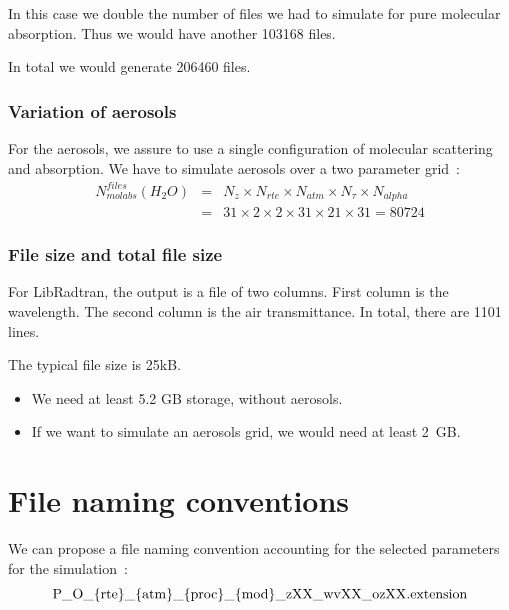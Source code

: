 \documentclass[a4paper]{article}
\begin{document}
In this case we double the number of files we had to simulate for pure molecular absorption.
Thus we would have another 103168 files.

In total we would generate 206460 files.


\subsubsection{Variation of aerosols}
For the aerosols, we assure to use a single configuration of molecular scattering and absorption.
We have to simulate aerosols over a two parameter grid~:
\begin{eqnarray}
N^{files}_{molabs}(H_2O) & = & N_z \times N_{rte} \times N_{atm} \times N_{\tau} \times N_{alpha}  \\ \nonumber
                                          & =  & 31   \times   2        \times    2         \times     31        \times     21            \times 31 = 80724
\end{eqnarray}




\subsubsection{File size and total file size}
For LibRadtran, the output is a file of two columns. First column is the wavelength. The second column is the air transmittance.
In total, there are 1101 lines.

The typical file size is 25kB.

\begin{itemize}
\item We need at least 5.2  GB storage, without aerosols. 
\item If we want to simulate an aerosols grid, we would need at least 2~GB.
\end{itemize}

\section{File naming conventions}

We can propose a file naming convention accounting for the selected parameters for the simulation~:
\begin{equation}
{\rm  P\_O\_\{rte\}\_\{atm\}\_\{proc\}\_\{mod\}\_zXX\_wvXX\_ozXX.extension  }\nonumber
\end{equation}
\end{document}

